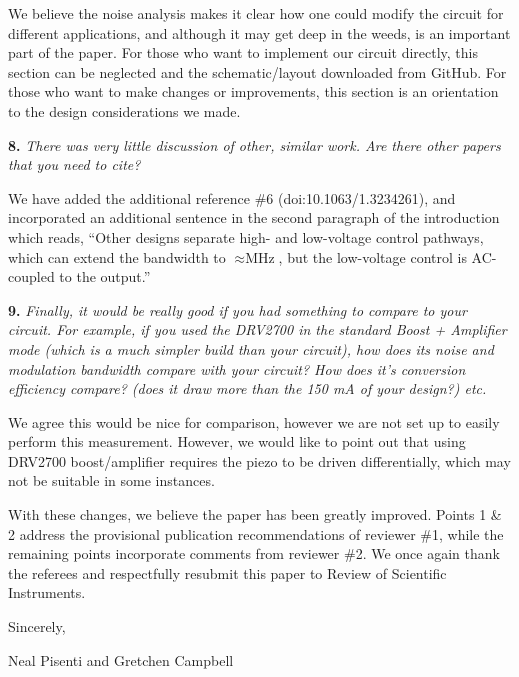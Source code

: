 \documentclass[12pt, oneside]{letter}   	%
\begin{document}
We believe the noise analysis makes it clear how one could modify the circuit for different applications, and although it may get deep in the weeds, is an important part of the paper.
For those who want to implement our circuit directly, this section can be neglected and the schematic/layout downloaded from GitHub.
For those who want to make changes or improvements, this section is an orientation to the design considerations we made.

\textbf{8.}
\textit{There was very little discussion of other, similar work. Are there other papers that you need to cite?}

We have added the additional reference \#6 (doi:10.1063/1.3234261), and incorporated an additional sentence in the second paragraph of the introduction which reads, ``Other designs separate high- and low-voltage control pathways, which can extend the bandwidth to $\approx\si{\mega\hertz}$, but the low-voltage control is AC-coupled to the output.''

\textbf{9.}
\textit{Finally, it would be really good if you had something to compare to your circuit. For example, if you used the DRV2700 in the standard Boost + Amplifier mode (which is a much simpler build than your circuit), how does its noise and modulation bandwidth compare with your circuit? How does it's conversion efficiency compare? (does it draw more than the 150 mA of your design?) etc. }

We agree this would be nice for comparison, however we are not set up to easily perform this measurement.
However, we would like to point out that using DRV2700 boost/amplifier requires the piezo to be driven differentially, which may not be suitable in some instances.

With these changes, we believe the paper has been greatly improved.
Points 1 \& 2 address the provisional publication recommendations of reviewer \#1, while the remaining points incorporate comments from reviewer \#2.
We once again thank the referees and respectfully resubmit this paper to Review of Scientific Instruments.

Sincerely,

Neal Pisenti and Gretchen Campbell
\end{document}
